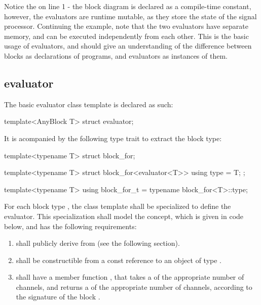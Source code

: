 Notice the  on line 1 - the block diagram is declared as a compile-time constant,
however, the evaluators  are runtime mutable, as they store the state of the signal processor. Continuing the
example, note that the two evaluators have separate memory, and can be executed independently from each
other. This is the basic usage of evaluators, and should give an understanding of the difference between
blocks as declarations of programs, and evaluators as instances of them.

\subsection{evaluator}
The basic evaluator class template is declared as such:

\begin{cppcodenl}
  template<AnyBlock T>
  struct evaluator;
\end{cppcodenl}

It is acompanied by the following type trait to extract the block type:

\begin{cppcodenl}
  template<typename T>
  struct block_for;

  template<typename T>
  struct block_for<evaluator<T>> {
    using type = T;
  };

  template<typename T>
  using block_for_t = typename block_for<T>::type;
\end{cppcodenl}

For each block type , the class template  shall be specialized to define the evaluator. This
specialization shall model the  concept, which is given in code below, and has the
following requirements:

\begin{enumerate}
  \item \label{item:derives}  shall publicly derive from  (see the following
        section).
  \item {} shall be constructible from a const reference to an object of type .
  \item {} shall have a member function , that takes a  of the appropriate number of channels,
        and returns a  of the appropriate number of channels, according to the signature of the
        block .
\end{enumerate}

